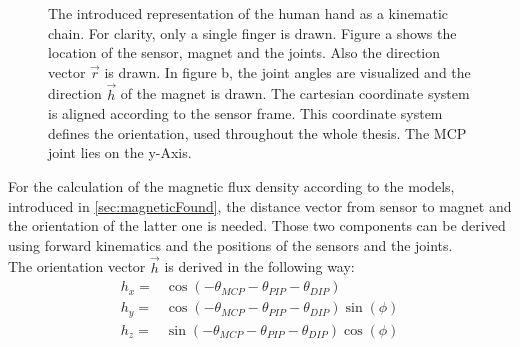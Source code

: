 \begin{figure}[!htb]
\centering
{}
\hfill
{}

\caption[The introduced hand model.]
{The introduced representation of the human hand as a kinematic chain. For clarity, only a single finger is drawn. Figure a shows the location of the sensor, magnet and the joints. Also the direction vector $ \vec{r} $ is drawn. In figure b, the joint angles are visualized and the direction $ \vec{h} $ of the magnet is drawn. The cartesian coordinate system is aligned according to the sensor frame. This coordinate system defines the orientation, used throughout the whole thesis. The \ac{MCP} joint lies on the y-Axis.}
\label{fig:handMod}
\end{figure}
For the calculation of the magnetic flux density according to the models, introduced in \ref{sec:magneticFound}, the distance vector from sensor to magnet and the orientation of the latter one is needed. Those two components can be derived using forward kinematics and the positions of the sensors and the joints.\\
The orientation vector $ \vec{h} $ is derived in the following way:
\begin{equation}\label{eq:orienH}
\begin{aligned}
h_{x} =& \cos(-\theta_{MCP}-\theta_{PIP}-\theta_{DIP})\\[3pt]
h_{y} =& \cos(-\theta_{MCP}-\theta_{PIP}-\theta_{DIP})\sin(\phi)\\[3pt]
h_{z} =& \sin(-\theta_{MCP}-\theta_{PIP}-\theta_{DIP})\cos(\phi)
\end{aligned}
\end{equation}

